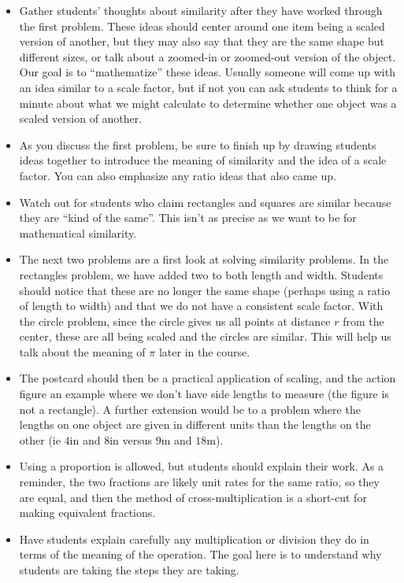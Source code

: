 \documentclass[noauthor,nooutcomes]{ximera}
\begin{document}
\begin{instructorNotes}
\begin{itemize}
 \item Gather students' thoughts about similarity after they have worked through the first problem. These ideas should center around one item being a scaled version of another, but they may also say that they are the same shape but different sizes, or talk about a zoomed-in or zoomed-out version of the object. Our goal is to ``mathematize'' these ideas. Usually someone will come up with an idea similar to a scale factor, but if not you can ask students to think for a minute about what we might calculate to determine whether one object was a scaled version of another.
 \item As you discuss the first problem, be sure to finish up by drawing students ideas together to introduce the meaning of similarity and the idea of a scale factor. You can also emphasize any ratio ideas that also came up. 
 \item Watch out for students who claim rectangles and squares are similar because they are ``kind of the same''. This isn't as precise as we want to be for mathematical similarity. 
 \item The next two problems are a first look at solving similarity problems. In the rectangles problem, we have added two to both length and width. Students should notice that these are no longer the same shape (perhaps using a ratio of length to width) and that we do not have a consistent scale factor. With the circle problem, since the circle gives us all points at distance $r$ from the center, these are all being scaled and the circles are similar. This will help us talk about the meaning of $\pi$ later in the course.
 \item The postcard should then be a practical application of scaling, and the action figure an example where we don't have side lengths to measure (the figure is not a rectangle). A further extension would be to a problem where the lengths on one object are given in different units than the lengths on the other (ie $4$in and $8$in versus $9$m and $18$m).
 \item Using a proportion is allowed, but students should explain their work. As a reminder, the two fractions are likely unit rates for the same ratio, so they are equal, and then the method of cross-multiplication is a short-cut for making equivalent fractions. 
 \item Have students explain carefully any multiplication or division they do in terms of the meaning of the operation. The goal here is to understand why students are taking the steps they are taking.

\end{itemize}
\end{instructorNotes}
\end{document}
